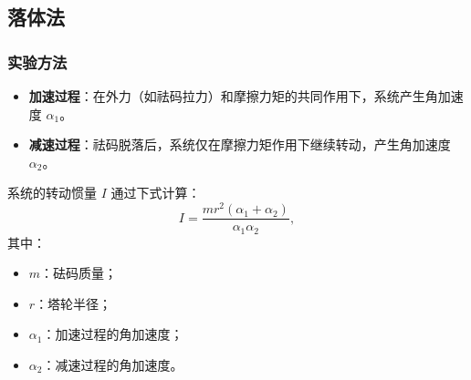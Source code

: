 \documentclass[12pt,hyperref,a4paper,UTF8]{ctexart}
\begin{document}
\subsection{落体法}
\subsubsection{实验方法}
\begin{itemize}
    \item \textbf{加速过程}：在外力（如祛码拉力）和摩擦力矩的共同作用下，系统产生角加速度 $\alpha_1$。
    \item \textbf{减速过程}：祛码脱落后，系统仅在摩擦力矩作用下继续转动，产生角加速度 $\alpha_2$。
\end{itemize}

系统的转动惯量 $I$ 通过下式计算：
\begin{equation}
    I = \frac{m r^2 (\alpha_1 + \alpha_2)}{\alpha_1 \alpha_2},
\end{equation}
其中：
\begin{itemize}
    \item $m$：砝码质量；
    \item $r$：塔轮半径；
    \item $\alpha_1$：加速过程的角加速度；
    \item $\alpha_2$：减速过程的角加速度。
\end{itemize}
\end{document}
